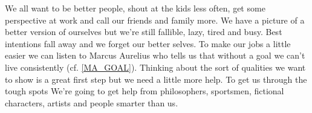 
\cleardoublepage

We all want to be better people, shout at the kids less often, get some perspective at work and call our friends and family more. We have a picture of a better version of ourselves but we're still fallible, lazy, tired and busy. Best intentions fall away and we forget our better selves. 
To make our jobs a little easier we can listen to Marcus Aurelius who tells us that without a goal we can't live consistently (cf. \ref{MA_GOAL}). Thinking about the sort of qualities we want to show is a great first step but we need a little more help. 
To get us through the tough spots We're going to get help from philosophers, sportsmen, fictional characters, artists and people smarter than us.

